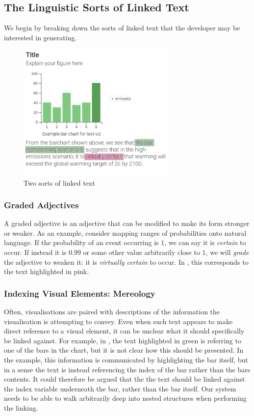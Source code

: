 \subsection{The Linguistic Sorts of Linked Text}
We begin by breaking down the sorts of linked text that the developer may
be interested in generating. 

\begin{figure}
   \includegraphics[width=0.7\textwidth]{fig/text-viz-types.png}
   \caption{Two sorts of linked text}
   \label{fig:linked-text-types}
\end{figure}

\subsubsection{Graded Adjectives}
A graded adjective is an adjective that can be modified to make its form stronger or weaker.
As an example, consider mapping ranges of probabilities onto natural language. If the probability
of an event occurring is $1$, we can say it is \emph{certain} to occur. If instead it is $0.99$
or some other value arbitrarily close to $1$, we will \emph{grade} the adjective to weaken it:
it is \emph{virtually certain} to occur. In , this corresponds to the text
highlighted in pink.

\subsubsection{Indexing Visual Elements: Mereology}
Often, visualisations are paired with descriptions of the information the visualisation is attempting to
convey. Even when such text appears to make direct reference to a visual element, it can be unclear what 
it should specifically be linked against. For example, in , the text highlighted
in green is referring to one of the bars in the chart, but it is not clear how this should be presented.
In the example, this information is communicated by highlighting the bar itself, but in a sense the text is
instead referencing the index of the bar rather than the bars contents. It could therefore be argued that the
the text should be linked against the index variable underneath the bar, rather than the bar itself.
Our system needs to be able to walk arbitrarily deep into nested structures when performing the linking.

